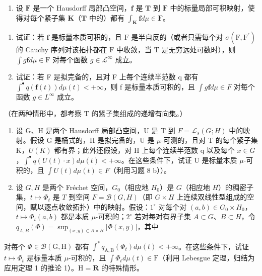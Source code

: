 \begin{enumerate}
\def\labelenumi{\arabic{enumi})}
\setcounter{enumi}{7}
\tightlist
\item
  设 \(\mathbf{F}\) 是一个 Hausdorff 局部凸空间，\(\mathbf{f}\) 是 \(\mathbf{T}\) 到 \(\mathbf{F}\) 中的标量局部可积映射，使得对每个紧子集 \(\mathbf{K}\)（\(\mathbf{T}\) 中的）都有 \(\int_{\mathbf{K}} \mathbf{f} d\mu \in \mathbf{F}\)。
\end{enumerate}

\begin{enumerate}
\def\labelenumi{\alph{enumi})}
\item
  试证：若 \(\mathbf{f}\) 是标量本质可积的，且 \(\mathrm{F}\) 是半自反的（或者只需每个对 \(\sigma (\mathrm{F},\mathrm{F}^{\prime})\) 的 Cauchy 序列对该拓扑都在 \(\mathrm{F}\) 中收敛，当 \(\mathrm{T}\) 是无穷远处可数时），则 \(\int g\mathbf{f}d\mu \in \mathrm{F}\) 对每个函数 \(g\in \mathcal{L}^{\infty}\) 成立。
\item
  试证：若 F 是拟完备的，且对 F 上每个连续半范数 q 都有 \(\int^{\bullet} q(\mathbf{f}(t)) d\mu(t) < +\infty\)，则 f 是标量本质可积的，且 \(\int g\mathbf{f} d\mu \in F\) 对每个函数 \(g \in L^{\infty}\) 成立。
\end{enumerate}

（在两种情形中，都考察 T 的紧子集组成的递增有向集。）

\begin{enumerate}
\def\labelenumi{\arabic{enumi})}
\setcounter{enumi}{8}
\item
  设 G、H 是两个 Hausdorff 局部凸空间，U 是 T 到 \(F = \mathcal{L}_{s}(G;H)\) 中的映射。假设 G 是桶式的，H 是拟完备的，U 是 \(\mu\)-可测的，且对 T 的每个紧子集 K，\(U(K)\) 都有界；此外还假设，对 H 上每个连续半范数 q 以及每个 \(x \in G\)，\(\int^{\bullet} q(U(t) \cdot x) d\mu(t) < +\infty\)。在这些条件下，试证 U 是标量本质 \(\mu\)-可积的，且 \(\int U(t) d\mu(t) \in F\)（利用习题 8 b））。
\item
  设 \(G, H\) 是两个 Fréchet 空间，\(G_0\)（相应地 \(H_0\)）是 \(G\)（相应地 \(H\)）的稠密子集，\(t \mapsto \Phi_t\) 是 \(T\) 到空间 \(F = \mathcal{B}(G, H)\)（即 \(G \times H\) 上连续双线性型组成的空间，赋以逐点收敛拓扑）中的映射。假设：\(1^\circ\) 对每个对 \((a, b) \in G_0 \times H_0\)，\(t \mapsto \Phi_t(a, b)\) 都是本质 \(\mu\)-可积的；\(2^\circ\) 若对每对有界子集 \(A \subset G\)、\(B \subset H\)，令 \(q_{A,B}(\Phi) = \sup_{(x, y) \in A \times B} |\Phi(x, y)|\)，其中
\end{enumerate}

对每个 \(\Phi \in \mathcal{B}(\mathrm{G},\mathrm{H})\) 都有 \(\int^{*}q_{\mathrm{A},\mathrm{B}}(\Phi_t)d\mu (t) < + \infty\)。在这些条件下，试证 \(t\mapsto \Phi_t\) 是标量本质 \(\mu\)-可积的，且 \(\int \Phi_t d\mu (t)\in \mathrm{F}\)（利用 Lebesgue 定理，归结为应用定理 1 的推论 1）。\(\mathrm{H} = \mathbf{R}\) 的特殊情形。

